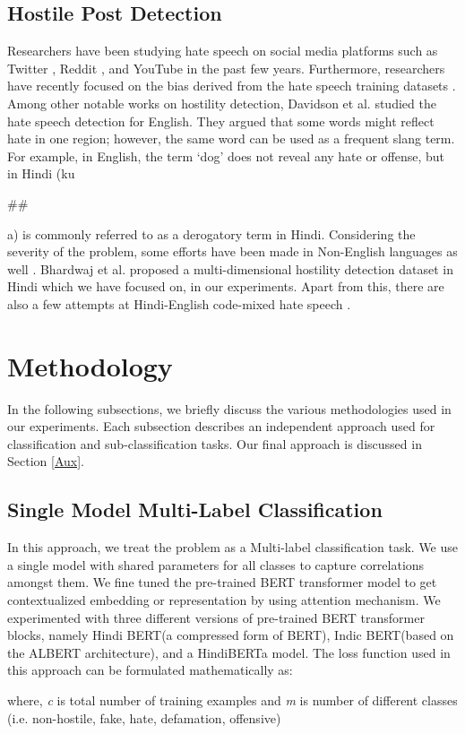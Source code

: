 \documentclass[runningheads]{llncs}
\begin{document}
\subsection*{Hostile Post Detection}Researchers have been studying hate speech on social media platforms such as Twitter \cite{ref_related_work}, Reddit \cite{ref_related_work_2}, and YouTube \cite{ref_related_work_4} in the past few years. Furthermore, researchers have recently focused on the bias derived from the hate speech training datasets \cite{ref_related_work_5}. Among other notable works on hostility detection, Davidson et al. \cite{Davidson} studied the hate speech detection for English. They argued that some words might reflect hate in one region; however, the same word can be used as a frequent slang term. For example, in English, the term ‘dog’ does not reveal any hate or offense, but in Hindi (ku\begin{small}\#\#\end{small}a) is commonly referred to as a derogatory term in Hindi. Considering the severity of the problem, some efforts have been made in Non-English languages as well \cite{ref_german,ref_arabic,ref_bangla,safi-samghabadi-etal-2020-aggression}. Bhardwaj et al. \cite{bhardwaj2020hostility} proposed a multi-dimensional hostility detection dataset in Hindi which we have focused on, in our experiments. Apart from this, there are also a few attempts at Hindi-English code-mixed hate speech \cite{ref_bohra}.

\section{Methodology}
\label{A}
In the following subsections, we briefly discuss the various methodologies used in our experiments. Each subsection describes an independent approach used for classification and sub-classification tasks. Our final approach is discussed in Section \ref{Aux}. 

\subsection{Single Model Multi-Label Classification}
\label{A_2}
{In this approach, we treat the problem as a Multi-label classification task. We use a single model with shared parameters for all classes to capture correlations amongst them. We fine tuned the pre-trained BERT transformer model to get contextualized embedding or representation by using attention mechanism. We experimented with three different versions of pre-trained BERT transformer blocks, namely Hindi BERT(a compressed form of BERT)\cite{HindiBERT}, Indic BERT(based on the ALBERT architecture)\cite{ref_indic_Nlp}, and a HindiBERTa model\cite{HindiBERTa}. The loss function used in this approach can be formulated mathematically as:




where, \textit{c} is total number of training examples 
and \textit{m} is number of different classes (i.e. non-hostile, fake, hate, defamation, offensive)
}
\end{document}
